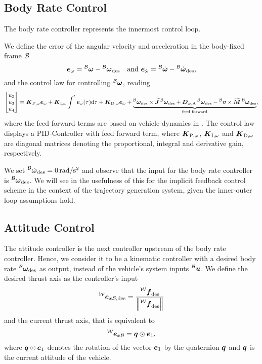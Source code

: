 \subsection{Body Rate Control}
The body rate controller represents the innermost control loop.

We define the error of the angular velocity and acceleration in the body-fixed frame $\mathcal{B}$
\begin{equation}
	\vangerror = \vangbody - \vangdesiredbody \quad \text{and }
	\aangerror = \aangbody - \aangdesiredbody
	,
\end{equation}
and the control law for controlling $\prescript{\mathcal{B}}{}{\mbox{$\bm{\omega}$}}$, reading
\begin{equation}
	\begin{bmatrix}
		u_2 \\ u_3 \\ u_4
	\end{bmatrix}
	=
	\KpBodyRate \vangerror
	+ \KiBodyRate \int_{}^{t} \vangerror(\tau)\text{d}\tau
	+ \KdBodyRate \aangerror
	+\underbrace{
		\vangdesiredbody \times \Jbs \vangdesiredbody
		+ \Domegaadded \vangdesiredbody
		- \vlinbody \times \Mbs \vangdesiredbody
	}_{\text{feed forward}}
	,
\end{equation}
where the feed forward terms are based on vehicle dynamics in . The control law displays a PID-Controller with feed forward term, where $\mbox{$\bm{K}$}_{\text{P},\omega}$, $\mbox{$\bm{K}$}_{\text{I},\omega}$ and $\mbox{$\bm{K}$}_{\text{D},\omega}$ are diagonal matrices denoting the proportional, integral and derivative gain, respectively.

We set $\aangdesiredbody = \unit[0]{rad/s^2}$ and observe that the input for the body rate controller is $\vangdesiredbody$. We will see in  the usefulness of this for the implicit feedback control scheme in the context of the trajectory generation system, given the inner-outer loop assumptions hold.

\subsection{Attitude Control}
The attitude controller is the next controller upstream of the body rate controller. Hence, we consider it to be a kinematic controller with a desired body rate $\vangdesiredbody$ as output, instead of the vehicle's system inputs $\prescript{\mathcal{B}}{}{\mbox{$\bm{u}$}}$. We define the desired thrust axis as the controller's input 
\begin{equation}
	\exdesiredbodyinworld =
	\frac{\thrustdesiredworld}{
		\left\lVert\thrustdesiredworld\right\rVert
	}
\end{equation}
and the current thrust axis, that is equivalent to 
\begin{equation}
	\prescript{\mathcal{W}}{}{\mbox{$\bm{e}$}}_{x\mathcal{B}} = \mbox{$\bm{q}$} \odot \mbox{$\bm{e}$}_1
	,
\end{equation}
where $\mbox{$\bm{q}$} \odot \mbox{$\bm{e}$}_1$ denotes the rotation of the vector $\mbox{$\bm{e}$}_1$ by the quaternion $\mbox{$\bm{q}$}$ and $\mbox{$\bm{q}$}$ is the current attitude of the vehicle.

